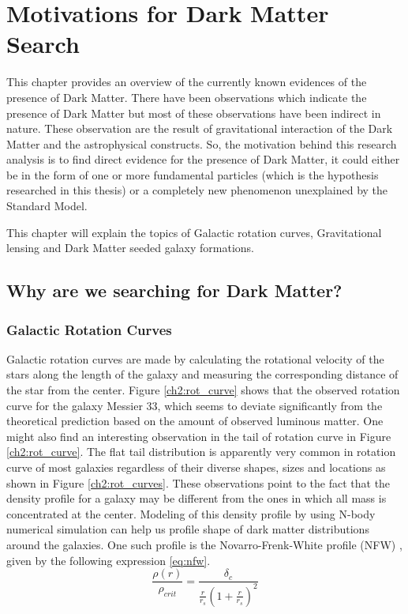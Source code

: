 \chapter{Motivations for Dark Matter Search}
\label{chapter:two}

This chapter provides an overview of the currently known evidences of the presence of Dark Matter. There have been observations which indicate the presence of Dark Matter but most of these observations have been indirect in nature. These observation are the result of gravitational interaction of the Dark Matter and the astrophysical constructs. So, the motivation behind this research analysis is to find direct evidence for the presence of Dark Matter, it could either be in the form of one or more fundamental particles (which is the hypothesis researched in this thesis) or a completely new phenomenon unexplained by the Standard Model.

This chapter will explain the topics of Galactic rotation curves, Gravitational lensing and Dark Matter seeded galaxy formations.
\section{Why are we searching for Dark Matter?}

\subsection{Galactic Rotation Curves}
Galactic rotation curves are made by calculating the rotational velocity of the stars along the length of the galaxy and measuring the corresponding distance of the star from the center. Figure \ref{ch2:rot_curve} shows that the observed rotation curve for the galaxy Messier 33, which seems to deviate significantly from the theoretical prediction based on the amount of observed luminous matter. One might also find an interesting observation in the tail of rotation curve in Figure  \ref{ch2:rot_curve}. The flat tail distribution is apparently very common in rotation curve of most galaxies regardless of their diverse shapes, sizes and locations as shown in Figure \ref{ch2:rot_curves}. These observations point to the fact that the density profile for a galaxy may be different from the ones in which all mass is concentrated at the center. Modeling of this density profile by using N-body numerical simulation can help us profile shape of dark matter distributions around the galaxies. One such profile is the Novarro-Frenk-White profile (NFW) \cite{ch2:Navarro_1997}, given by the following expression \ref{eq:nfw}.
\begin{equation}
\frac{\rho(r)}{\rho_{crit}} = \frac{\delta_{c}}{\frac{r}{r_{s}} \left(1+ \frac{r}{r_{s}}\right)^{2}}
  \label{eq:nfw}
\end{equation}


